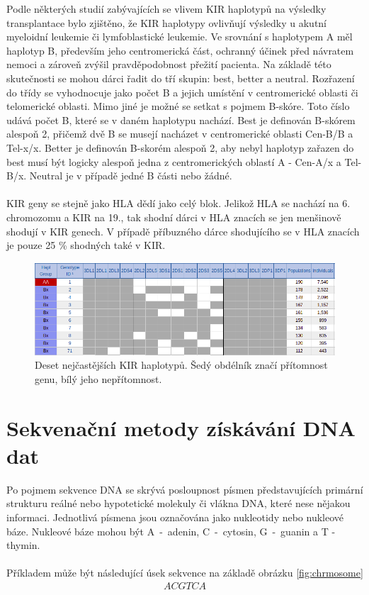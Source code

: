 \documentclass[czech,DP]{thesiskiv}
\numberwithin{equation}{section}
\begin{document}
\noindent
Podle některých studií zabývajících se vlivem KIR haplotypů na výsledky transplantace bylo zjištěno, že KIR haplotypy ovlivňují výsledky u akutní myeloidní leukemie či  lymfoblastické leukemie. Ve srovnání s haplotypem A měl haplotyp B, především jeho centromerická část, ochranný účinek před návratem nemoci a zároveň zvýšil pravděpodobnost přežití pacienta. Na základě této skutečnosti se mohou dárci řadit do tří skupin: best, better a neutral. Rozřazení do třídy se vyhodnocuje jako počet B a jejich umístění v centromerické oblasti či telomerické oblasti. Mimo jiné je možné se setkat s pojmem B-skóre. Toto číslo udává počet B, které se v daném haplotypu nachází. Best je definován B-skórem alespoň 2, přičemž dvě B se musejí nacházet v centromerické oblasti Cen-B/B a Tel-x/x. Better je definován B-skorém alespoň 2, aby nebyl haplotyp zařazen do best musí být logicky alespoň jedna z centromerických oblastí A - Cen-A/x a Tel-B/x. Neutral je v případě jedné B části nebo žádné. \cite{KIR_haplotypy}
\\
\\
KIR geny se stejně jako HLA dědí jako celý blok. Jelikož HLA se nachází na 6. chromozomu a KIR na 19., tak shodní dárci v HLA znacích se jen menšinově shodují v KIR genech. V případě příbuzného dárce shodujícího se v HLA znacích je pouze 25 \% shodných také v KIR. \cite{KIR_haplotypy}

\begin{figure}[H]		
		\centering
		\includegraphics[width=\textwidth]{./img/KIR_haplotypy_priklad.png}
		\caption{Deset nejčastějších KIR haplotypů. Šedý obdélník značí přítomnost genu, bílý jeho nepřítomnost. \cite{kir_genotypes_10}}
		\label{fig:kir_haplotypy_10}
\end{figure}
 

\chapter{Sekvenační metody získávání DNA dat}
Po pojmem sekvence DNA se skrývá posloupnost písmen představujících primární strukturu reálné nebo hypotetické molekuly či vlákna DNA, které nese nějakou informaci. Jednotlivá písmena jsou označována jako nukleotidy nebo nukleové báze. Nukleové báze mohou být A~-~adenin, C~-~cytosin, G~-~guanin a T - thymin. \cite{genome_gov}
\\
\\
\noindent
Příkladem může být následující úsek sekvence na základě obrázku \ref{fig:chrmosome} 
\begin{align}
   \label{sekvence_prikad} ACGTCA
\end{align}
\end{document}
